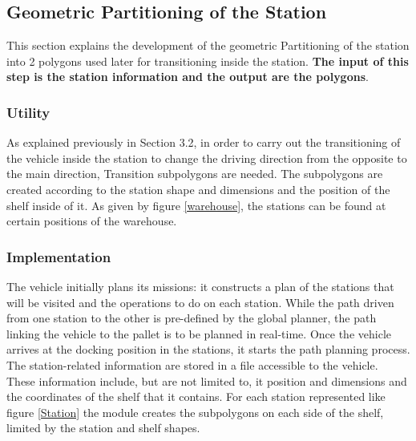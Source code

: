 \subsection{Geometric Partitioning of the Station}
This section explains the development of the geometric Partitioning of the station into 2 polygons used later for 
transitioning inside the station. \textbf{The input of this step is the station information and the output are the polygons}.
\subsubsection{Utility}
As explained previously in Section 3.2, in order to carry out the transitioning of the vehicle inside 
the station to change the driving direction from the opposite to the main direction, Transition subpolygons are needed. 
The subpolygons are created according to the station shape and dimensions and the position of the shelf inside of it. 
As given by figure \ref{warehouse}, the stations can be found at certain positions of the warehouse.

\subsubsection{Implementation}
The vehicle initially plans its missions: it constructs a plan of the stations that will be visited and the operations
to do on each station. While the path driven from one station to the other is pre-defined by the global planner, 
the path linking the vehicle to the pallet is to be planned in real-time. 
Once the vehicle arrives at the docking position in the stations, it starts the path planning process. 
The station-related information are stored in a file accessible to the vehicle. These information include, but are 
not limited to, it position and dimensions and the coordinates of the shelf that it contains.
For each station represented like figure \ref{Station} the module creates the subpolygons on each side of the shelf, 
limited by the station and shelf shapes. 

